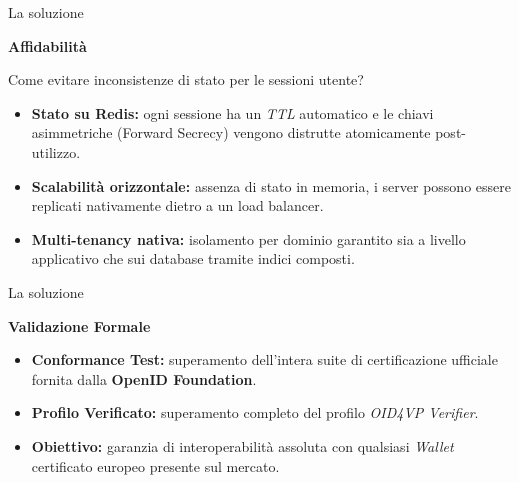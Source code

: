 \documentclass{beamer}
\begin{document}
	\begin{frame}{La soluzione}
		\vfill
		{\centering \huge{\textbf{\textcolor{rossoPantano}{Affidabilità}}} \par}
		\vspace{0.5em}
		Come evitare inconsistenze di stato per le sessioni utente? \vspace{.5em}
		\begin{itemize}
			\item \textbf{Stato su Redis:} ogni sessione ha un \textit{TTL} automatico e le chiavi asimmetriche (Forward Secrecy) vengono distrutte atomicamente post-utilizzo. \vspace{.5em}
			\item \textbf{Scalabilità orizzontale:} assenza di stato in memoria, i server possono essere replicati nativamente dietro a un load balancer. \vspace{.5em}
			\item \textbf{Multi-tenancy nativa:} isolamento per dominio garantito sia a livello applicativo che sui database tramite indici composti.
		\end{itemize}
		\vfill
	\end{frame}
	
	\begin{frame}{La soluzione}
		\vfill
		{\centering \huge{\textbf{\textcolor{rossoPantano}{Validazione Formale}}} \par}
		\vspace{0.5em}
		\begin{itemize}
			\item \textbf{Conformance Test:} superamento dell'intera suite di certificazione ufficiale fornita dalla \textbf{OpenID Foundation}. \vspace{.5em}
			\item \textbf{Profilo Verificato:} superamento completo del profilo \textit{OID4VP Verifier}. \vspace{.5em}
			\item \textbf{Obiettivo:} garanzia di interoperabilità assoluta con qualsiasi \textit{Wallet} certificato europeo presente sul mercato.
		\end{itemize}
		\vfill
	\end{frame}
\end{document}

